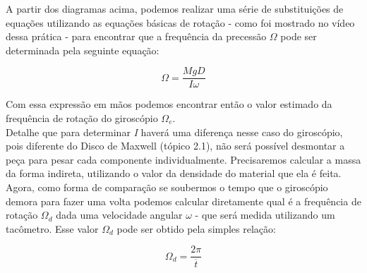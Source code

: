 A partir dos diagramas acima, podemos realizar uma série de substituições de equações utilizando as equações básicas de rotação - como foi mostrado no vídeo dessa prática - para encontrar que a frequência da precessão $\Omega$ pode ser determinada pela seguinte equação:

\[ \Omega = \frac{MgD}{I \omega} \]

Com essa expressão em mãos podemos encontrar então o valor estimado da frequência de rotação do giroscópio $\Omega _e$.\\

Detalhe que para determinar \textit{I} haverá uma diferença nesse caso do giroscópio, pois diferente do Disco de Maxwell (tópico 2.1), não será possível desmontar a peça para pesar cada componente individualmente. Precisaremos calcular a massa da forma indireta, utilizando o valor da densidade do material que ela é feita.\\

Agora, como forma de comparação se soubermos o tempo que o giroscópio demora para fazer uma volta podemos calcular diretamente qual é a frequência de rotação $\Omega _d$ dada uma velocidade angular $\omega$ - que será medida utilizando um tacômetro. Esse valor $\Omega _d$ pode ser obtido pela simples relação:

\[ \Omega _d = \frac{2\pi}{\overline{t}} \]

